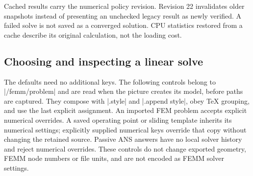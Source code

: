 \noindent\begin{minipage}{\linewidth}
\begin{codeexample}[width=0pt]
\end{codeexample}
\end{minipage}

Cached results carry the numerical policy revision. Revision 22 invalidates
older snapshots instead of presenting an unchecked legacy result as newly
verified. A failed solve is not saved as a converged solution. CPU statistics
restored from a cache describe its original calculation, not the loading cost.

\subsection{Choosing and inspecting a linear solve}
\label{sec:linear-controls}
The defaults need no additional keys. The following controls belong to
|/femm/problem| and are read when the picture creates its model, before paths
are captured. They compose with |.style| and |.append style|, obey TeX grouping,
and use the last explicit assignment. An imported FEM problem accepts explicit
numerical overrides. A saved operating point or sliding template inherits its
numerical settings; explicitly supplied numerical keys override that copy without
changing the retained source. Passive ANS answers have no local solver history
and reject numerical overrides. These controls do not change exported geometry,
FEMM node numbers or file units, and are not encoded as FEMM solver settings.

